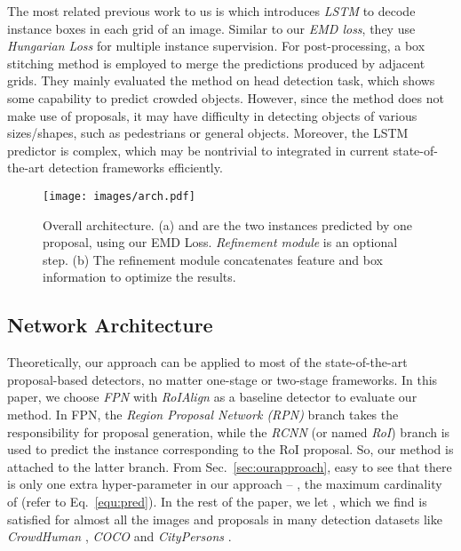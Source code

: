 \documentclass[10pt,twocolumn,letterpaper]{article}
\begin{document}
The most related previous work to us is \cite{stewart2016end} which introduces \emph{LSTM} to decode instance boxes in each grid of an image. Similar to our \emph{EMD loss}, they use \emph{Hungarian Loss} for multiple instance supervision. For post-processing, a box stitching method is employed to merge the predictions produced by adjacent grids. They mainly evaluated the method on head detection task, which shows some capability to predict crowded objects. However, since the method does not make use of proposals, it may have difficulty in detecting objects of various sizes/shapes, such as pedestrians or general objects. Moreover, the LSTM predictor is complex, which may be nontrivial to integrated in current state-of-the-art detection frameworks \cite{lin2017feature,lin2017focal,he2017mask} efficiently. 

\begin{figure}[t]
\begin{center}
 \texttt{[image: images/arch.pdf]}
\end{center}
   \caption{Overall architecture. (a)  and  are the two instances predicted by one proposal, using our EMD Loss. \emph{Refinement module} is an optional step. (b) The refinement module concatenates feature and box information to optimize the results.}
\label{fig:arch}
\end{figure}

\subsection{Network Architecture}
\label{sec:arch}
Theoretically, our approach can be applied to most of the state-of-the-art proposal-based detectors, no matter one-stage \cite{liu2016ssd,lin2017focal,yolov3} or two-stage \cite{ren2015faster,lin2017feature,he2017mask} frameworks.  In this paper, we choose \emph{FPN} \cite{lin2017feature} with \emph{RoIAlign} \cite{he2017mask} as a baseline detector to evaluate our method. In FPN, the \emph{Region Proposal Network (RPN)} branch takes the responsibility for proposal generation, while the \emph{RCNN} (or named \emph{RoI}) branch is used to predict the instance corresponding to the RoI proposal. So, our method is attached to the latter branch. From Sec.~\ref{sec:ourapproach}, easy to see that there is only one extra hyper-parameter in our approach -- , the maximum cardinality of  (refer to Eq.~\ref{equ:pred}). In the rest of the paper, we let , which we find is satisfied for almost all the images and proposals in many detection datasets like \emph{CrowdHuman} \cite{shao2018crowdhuman}, \emph{COCO} \cite{lin2014microsoft} and \emph{CityPersons} \cite{zhang2017citypersons}.
\end{document}
